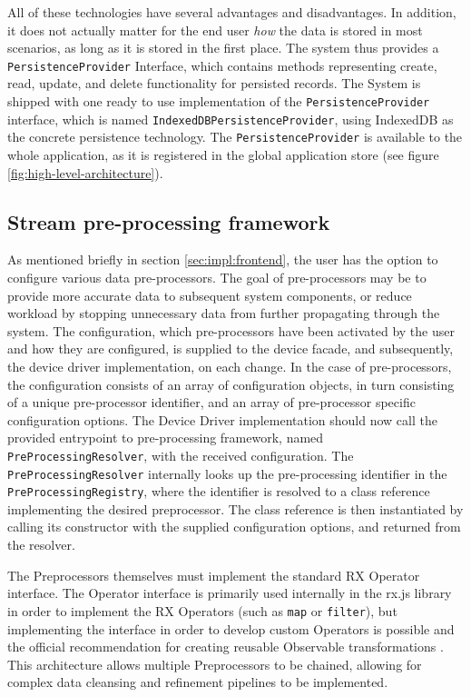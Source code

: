 All of these technologies have several advantages and disadvantages. In addition, it does not actually matter for the end user \emph{how} the data is stored in most scenarios, as long as it is stored in the first place. The system thus provides a \texttt{PersistenceProvider} Interface, which contains methods representing create, read, update, and delete functionality for persisted records. The System is shipped with one ready to use implementation of the \texttt{PersistenceProvider} interface, which is named \texttt{IndexedDBPersistenceProvider}, using IndexedDB as the concrete persistence technology. The \texttt{PersistenceProvider} is available to the whole application, as it is registered in the global application store (see figure \ref{fig:high-level-architecture}).


\subsection{Stream pre-processing framework}
\label{sec:impl:preprocessing}
As mentioned briefly in section \ref{sec:impl:frontend}, the user has the option to configure various data pre-processors. The goal of pre-processors may be to provide more accurate data to subsequent system components, or reduce workload by stopping unnecessary data from further propagating through the system. The configuration, which pre-processors have been activated by the user and how they are configured, is supplied to the device facade, and subsequently, the device driver implementation, on each change. In the case of pre-processors, the configuration consists of an array of configuration objects, in turn consisting of a unique pre-processor identifier, and an array of pre-processor specific configuration options. The Device Driver implementation should now call the provided entrypoint to pre-processing framework, named \texttt{PreProcessingResolver}, with the received configuration. The \texttt{PreProcessingResolver} internally looks up the pre-processing identifier in the \texttt{PreProcessingRegistry}, where the identifier is resolved to a class reference implementing the desired preprocessor. The class reference is then instantiated by calling its constructor with the supplied configuration options, and returned from the resolver.

The Preprocessors themselves must implement the standard \gls{RX} Operator interface. The Operator interface is primarily used internally in the rx.js library in order to implement the \gls{RX} Operators (such as \texttt{map} or \texttt{filter}), but implementing the interface in order to develop custom Operators is possible and the official recommendation for creating reusable Observable transformations \cite{RxJsOperatorCreation}. This architecture allows multiple Preprocessors to be chained, allowing for complex data cleansing and refinement pipelines to be implemented.

